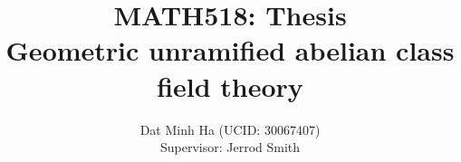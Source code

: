 





	\title{\textbf{MATH518: Thesis
	\\
	Geometric unramified abelian class field theory}}
	
	\author{Dat Minh Ha (UCID: 30067407)\\Supervisor: Jerrod Smith}
	\maketitle
	
	{
      \hypersetup{} 
      \tableofcontents %
    }
	
	\newpage
	
	{
      \hypersetup{hidelinks} 
      \listoftodos
    }
    
    \newpage
	

